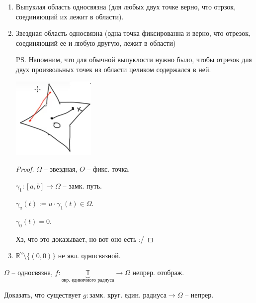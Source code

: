 \begin{example}
    \begin{enumerate}
        \item {
            Выпуклая область односвязна (для любых двух точке верно, что отрзок, соединяющий их лежит в области).
        }
        \item {
            Звездная область односвязна (одна точка фиксированна и верно, что отрезок, соединяющий ее и любую другую, лежит в области)
            
            PS. Напомним, что для обычной выпуклости нужно было, чтобы отрезок для двух произвольных точек из области целиком содержался в ней.

            \begin{center}
                \includegraphics[width=4cm]{assets/03-intergrals-with-params/example-picture.png}
            \end{center}

            \begin{proof}
                $\Omega$ -- звездная, $O$ -- фикс. точка.

                $\gamma_1: [a, b] \rightarrow \Omega$ -- замк. путь.

                $\gamma_u(t) := u \cdot \gamma_1(t) \in \Omega$.

                $\gamma_0(t) = 0$.

                Хз, что это доказывает, но вот оно есть :/
            \end{proof}
        }
        \item {
            $\mathbb{R}^2 \setminus \{ (0, 0) \}$ не явл. односвязной.
        }
    \end{enumerate}
\end{example}

\begin{exerc}
    $\Omega$ -- односвязна, $f: \underbrace{\mathbb{T}}_{\text{окр. единичного радиуса}} \rightarrow \Omega$ непрер. отображ.

    Доказать, что существует $g: \text{замк. круг. един. радиуса} \rightarrow \Omega$ -- непрер.
\end{exerc}

